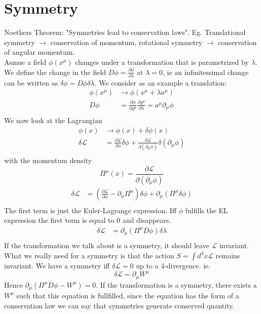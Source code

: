 \documentclass{report}
\begin{document}
\chapter{Symmetry}
Noethers Theorem: "Symmetries lead to conservation laws". Eg. Translational symmetry $\to$ conservation of momentum, rotational symmetry $\to $ conservation of angular momentum.\\
Asmue a field $\phi(x^\mu)$ changes under a transformation that is parametrized by $\lambda $. We define the change in the field $D\phi = \frac{\partial \phi}{\partial \lambda } $ at $\lambda = 0$, ie an infinitessimal change can be written as $\delta \phi = D \phi \delta\lambda $. We consider as an example a translation:
\begin{align*}
	\phi(x^\mu) &\to \phi\left( x^\mu + \lambda a^\mu \right) \\
	D \phi &=  \frac{\partial \phi }{\partial y^\mu} \frac{\partial y^\mu }{\partial \lambda } = a^\mu \partial_\mu \phi \\
\end{align*}
We now look at the Lagrangian
\begin{align*}
	\phi(x) &\to \phi(x) + \delta \phi(x) \\
	\delta \mathcal{L} &=  \frac{\partial \mathcal{L}}{\partial \phi } \delta \phi + \frac{\partial \mathcal{L}}{\partial \left( \partial_{\mu} \phi  \right) }  \delta\left( \partial_{\mu} \phi   \right)    \\
\end{align*}
with the momentum density \[
	\Pi^\mu(x) = \frac{\partial \mathcal{L}}{\partial \left( \partial_\mu \phi   \right) }  
\] 
\begin{align*}
	\delta \mathcal{L} &= \left( \frac{\partial \mathcal{L}}{\partial \phi } - \partial_\mu \Pi^\mu   \right) \delta \phi + \partial_\mu\left( \Pi^\mu \delta\phi  \right)   \\
\end{align*}
The first term is just the Euler-Lagrange expression. Iff $\phi $ fulfills the EL expression the first term is equal to $0$ and disappears.
\begin{align*}
	\delta \mathcal{L} &= \partial_\mu \left( \Pi^\mu D\phi  \right) \delta\lambda  \\
\end{align*}
If the transformation we talk about is a symmetry, it should leave $\mathcal{L}$ invariant. What we really need for a symmetry is that the action $S = \int d^4x \mathcal{L}$ remains invariant. We have a symmetry iff $\delta \mathcal{L} = 0$ up to a 4-divergence. ie. \[
	\delta \mathcal{L} = \partial_\mu W^\mu 
\] Hence $\partial_\mu\left( \Pi^\mu D\phi - W^\mu \right) = 0$. If the transformation is a symmetry, there exists a $W^\mu $ such that this equation is fullfilled, since the equation has the form of a conservation law we can say that symmetries generate conserved quantity.\\
\end{document}
